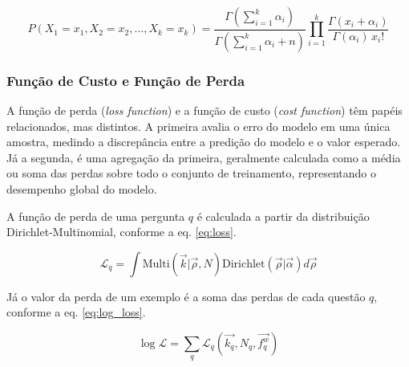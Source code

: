 \begin{equation}\label{eq:dirichlet-multinomial}
  P(X_1 = x_1, X_2 = x_2, \dots, X_k = x_k) = \frac{\Gamma\left(\sum_{i=1}^k \alpha_i\right)}{\Gamma\left(\sum_{i=1}^k \alpha_i + n\right)} \prod_{i=1}^k \frac{\Gamma(x_i + \alpha_i)}{\Gamma(\alpha_i) \, x_i!}
\end{equation}




\subsubsection{Função de Custo e Função de Perda}
\label{sec:modelo-loss-cost}

A função de perda (\emph{loss function}) e a função de custo (\emph{cost function}) têm papéis relacionados, mas distintos. A primeira avalia o erro do modelo em uma única amostra, medindo a discrepância entre a predição do modelo e o valor esperado. Já a segunda, é uma agregação da primeira, geralmente calculada como a média ou soma das perdas sobre todo o conjunto de treinamento, representando o desempenho global do modelo. %



A função de perda de uma pergunta $q$ é calculada a partir da distribuição Dirichlet-Multinomial, conforme a eq. \eqref{eq:loss}.

\begin{equation}\label{eq:loss}
  \mathcal{L}_q = \int\text{Multi}(\vec{k}|\vec{\rho}, N) \text{Dirichlet}(\vec{\rho}|\vec{\alpha})d\vec{\rho}
\end{equation}

Já o valor da perda de um exemplo é a soma das perdas de cada questão $q$, conforme a eq. \eqref{eq:log_loss}.

\begin{equation}\label{eq:log_loss}
  \log \mathcal{L} = \sum_q \mathcal{L}_q(\vec{k_q}, N_q, \vec{f_q^w})
\end{equation}

